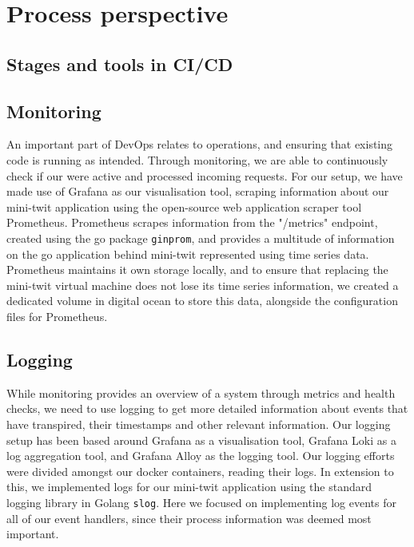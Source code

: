\section{Process perspective} \label{pp}
\subsection{Stages and tools in CI/CD} %


\subsection{Monitoring} %
An important part of DevOps relates to operations, and ensuring that existing code is running as intended. Through monitoring, we are able to continuously check if our were active and processed incoming requests. For our setup, we have made use of Grafana as our visualisation tool, scraping information about our mini-twit application using the open-source web application scraper tool Prometheus. Prometheus scrapes information from the "/metrics" endpoint, created using the go package \texttt{ginprom}, and provides a multitude of information on the go application behind mini-twit represented using time series data. Prometheus maintains it own storage locally, and to ensure that replacing the mini-twit virtual machine does not lose its time series information, we created a dedicated volume in digital ocean to store this data, alongside the configuration files for Prometheus. 
\subsection{Logging} %
While monitoring provides an overview of a system through metrics and health checks, we need to use logging to get more detailed information about events that have transpired, their timestamps and other relevant information. Our logging setup has been based around Grafana as a visualisation tool, Grafana Loki as a log aggregation tool, and Grafana Alloy as the logging tool. Our logging efforts were divided amongst our docker containers, reading their logs. In extension to this, we implemented logs for our mini-twit application using the standard logging library in Golang \texttt{slog}. Here we focused on implementing log events for all of our event handlers, since their process information was deemed most important. 




